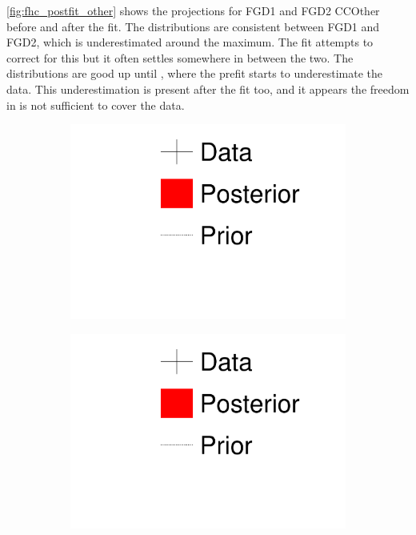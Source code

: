 \autoref{fig:fhc_postfit_other} shows the projections for FGD1 and FGD2 CCOther before and after the fit. The \pmu distributions are consistent between FGD1 and FGD2, which is underestimated around the maximum. The fit attempts to correct for this but it often settles somewhere in between the two. The \cosmu distributions are good up until , where the prefit starts to underestimate the data. This underestimation is present after the fit too, and it appears the freedom in \cosmu is not sufficient to cover the data. 
\begin{figure}[h]
	\begin{subfigure}[t]{0.2\textwidth}
		\includegraphics[width=\textwidth, trim={0mm 90mm 0mm 0mm}, clip,page=1]{figures/mach3/1D_legend_Data_Posterior_Prior}
	\end{subfigure}
	\begin{subfigure}[t]{0.2\textwidth}
		\includegraphics[width=\textwidth, trim={0mm 45mm 0mm 50mm}, clip,page=1]{figures/mach3/1D_legend_Data_Posterior_Prior}

\end{subfigure}
\end{figure}
